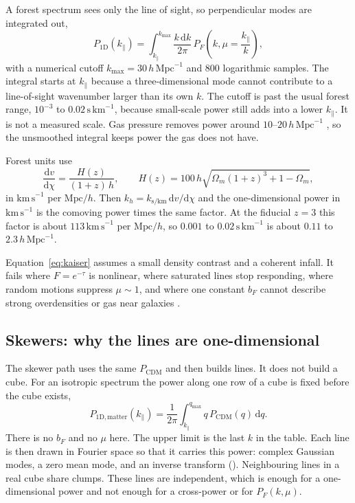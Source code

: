 \documentclass[11pt]{article}
\begin{document}
A forest spectrum sees only the line of sight, so perpendicular modes are integrated out,
\begin{equation}
\label{eq:p1d}
P_{1\mathrm{D}}(k_\parallel)
=
\int_{k_\parallel}^{k_\mathrm{max}}
\frac{k\,\mathrm{d}k}{2\pi}\,
P_F\!\left(k,\mu=\frac{k_\parallel}{k}\right),
\end{equation}
with a numerical cutoff $k_\mathrm{max}=30\,h\,\mathrm{Mpc}^{-1}$ and 800 logarithmic samples. The integral starts at $k_\parallel$ because a three-dimensional mode cannot contribute to a line-of-sight wavenumber larger than its own $k$. The cutoff is past the usual forest range, $10^{-3}$ to $0.02\,\mathrm{s\,km}^{-1}$, because small-scale power still adds into a lower $k_\parallel$. It is not a measured scale. Gas pressure removes power around $10$--$20\,h\,\mathrm{Mpc}^{-1}$ \cite{McDonald:2001fe}, so the unsmoothed integral keeps power the gas does not have.

Forest units use
\begin{equation}
\label{eq:units}
\frac{\mathrm{d}v}{\mathrm{d}\chi}
=
\frac{H(z)}{(1+z)\,h},
\qquad
H(z)=100\,h\sqrt{\Omega_m(1+z)^{3}+1-\Omega_m},
\end{equation}
in $\mathrm{km\,s}^{-1}$ per $\mathrm{Mpc}/h$. Then $k_h=k_{\mathrm{s/km}}\,\mathrm{d}v/\mathrm{d}\chi$ and the one-dimensional power in $\mathrm{km\,s}^{-1}$ is the comoving power times the same factor. At the fiducial $z=3$ this factor is about $113\,\mathrm{km\,s}^{-1}$ per $\mathrm{Mpc}/h$, so $0.001$ to $0.02\,\mathrm{s\,km}^{-1}$ is about $0.11$ to $2.3\,h\,\mathrm{Mpc}^{-1}$.

Equation~\eqref{eq:kaiser} assumes a small density contrast and a coherent infall. It fails where $F=e^{-\tau}$ is nonlinear, where saturated lines stop responding, where random motions suppress $\mu\sim 1$, and where one constant $b_F$ cannot describe strong overdensities or gas near galaxies \cite{Kooistra:2022hzw}.

\subsection{Skewers: why the lines are one-dimensional}

The skewer path uses the same $P_\mathrm{CDM}$ and then builds lines. It does not build a cube. For an isotropic spectrum the power along one row of a cube is fixed before the cube exists,
\begin{equation}
\label{eq:matter1d}
P_{1\mathrm{D},\mathrm{matter}}(k_\parallel)
=
\frac{1}{2\pi}
\int_{k_\parallel}^{q_\mathrm{max}}
q\,P_\mathrm{CDM}(q)\,\mathrm{d}q.
\end{equation}
There is no $b_F$ and no $\mu$ here. The upper limit is the last $k$ in the table. Each line is then drawn in Fourier space so that it carries this power: complex Gaussian modes, a zero mean mode, and an inverse transform (). Neighbouring lines in a real cube share clumps. These lines are independent, which is enough for a one-dimensional power and not enough for a cross-power or for $P_F(k,\mu)$.
\end{document}
